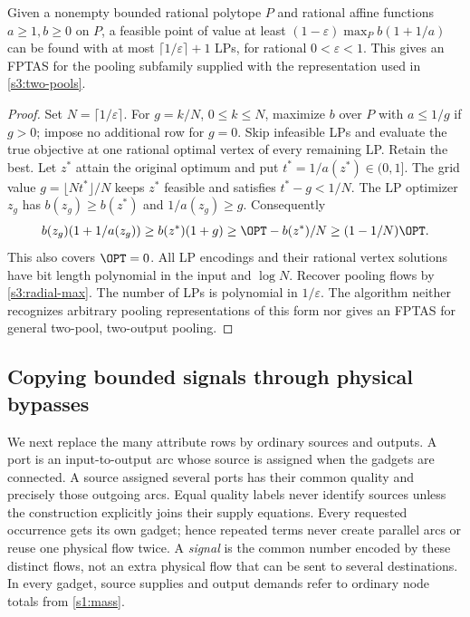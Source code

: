 \begin{proposition}\label{s3:fptas}
Given a nonempty bounded rational polytope $P$ and rational affine
functions $a\ge1,b\ge0$ on $P$, a feasible point of value at least
$(1-\varepsilon)\max_P b(1+1/a)$ can be found with at most
$\lceil1/\varepsilon\rceil+1$ LPs, for rational $0<\varepsilon<1$.
This gives an FPTAS for the pooling subfamily supplied with the
representation used in \cref{s3:two-pools}.
\end{proposition}
\begin{proof}
Set $N=\lceil1/\varepsilon\rceil$. For $g=k/N$, $0\le k\le N$,
maximize $b$ over $P$ with $a\le1/g$ if $g>0$; impose no additional
row for $g=0$. Skip infeasible LPs and evaluate the true objective at
one rational optimal vertex of every remaining LP. Retain the best.
Let $z^*$ attain the original optimum and put $t^*=1/a(z^*)\in(0,1]$.
The grid value $g=\lfloor Nt^*\rfloor/N$ keeps $z^*$ feasible and
satisfies $t^*-g<1/N$. The LP optimizer $z_g$ has $b(z_g)\ge b(z^*)$
and $1/a(z_g)\ge g$. Consequently
\[
 b(z_g)(1+1/a(z_g))\ge b(z^*)(1+g)
 \ge\OPT-b(z^*)/N\ge(1-1/N)\OPT.
\]
This also covers $\OPT=0$. All LP encodings and their rational vertex
solutions have bit length polynomial in the input and $\log N$.
Recover pooling flows by \eqref{s3:radial-max}. The number of LPs is
polynomial in $1/\varepsilon$. The algorithm neither recognizes arbitrary
pooling representations of this form nor gives an FPTAS for general
two-pool, two-output pooling.
\end{proof}

\subsection{Copying bounded signals through physical bypasses}\label{s3:copy}

We next replace the many attribute rows by ordinary sources and outputs.
A port is an input-to-output arc whose source is assigned when the gadgets
are connected. A source assigned several ports has their common quality
and precisely those outgoing arcs. Equal quality labels never identify
sources unless the construction explicitly joins their supply equations.
Every requested occurrence gets its own gadget; hence repeated terms
never create parallel arcs or reuse one physical flow twice. A \emph{signal}
is the common number encoded by these distinct flows, not an extra
physical flow that can be sent to several destinations. In every gadget,
source supplies and output demands refer to ordinary node totals from
\cref{s1:mass}.

